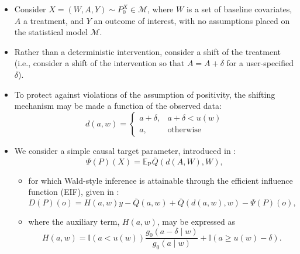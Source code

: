 \documentclass[landscape,a0paper,fontscale=0.285]{baposter} %
\begin{document}
\begin{poster}
{\begin{itemize}
  \itemsep1.5pt
  \item Consider $X = (W, A, Y) \sim P_0^X \in \mathcal{M}$, where $W$ is a set
    of baseline covariates, $A$ a treatment, and $Y$ an outcome of interest,
    with no assumptions placed on the statistical model $\mathcal{M}$.
  \item Rather than a deterministic intervention, consider a shift of the
    treatment (i.e., consider a shift of the intervention so that
    $A = A + \delta$ for a user-specified $\delta$).
  \item To protect against violations of the assumption of positivity, the
    shifting mechanism may be made a function of the observed data:
    \[ d(a, w) =
       \begin{cases}
         a + \delta, & a + \delta < u(w) \\
         a, & \text{otherwise}
       \end{cases}
    \]
  \item We consider a simple causal target parameter, introduced in
    \cite{munoz2012population}:
    \begin{equation}
    \Psi(P)(X) = \mathbb{E}_{\text{P}}{\overline{Q}(d(A, W), W)},
    \end{equation}
    \begin{itemize}
      \item for which Wald-style inference is attainable through the efficient
        influence function (EIF), given in \cite{diaz2018stochastic}:
        \begin{equation}
          D(P)(o) = H(a, w){y - \overline{Q}(a, w)} + \overline{Q}(d(a, w), w) -
            \Psi(P)(o),
        \end{equation}
      \item where the auxiliary term, $H(a,w)$, may be expressed as
        \begin{equation}
          H(a,w) = \mathbb{I}(a < u(w)) \frac{g_0(a - \delta \mid w)}{g_0(a
            \mid w)} + \mathbb{I}(a \geq u(w) - \delta).
        \end{equation}
    \end{itemize}
\end{itemize}
}


\end{poster}
\end{document}
